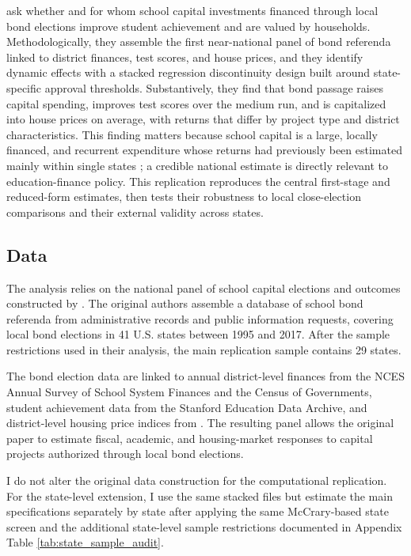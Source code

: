 \citet{biasi_what_2025} ask whether and for whom school capital investments financed through local bond elections improve student achievement and are valued by households. Methodologically, they assemble the first near-national panel of bond referenda linked to district finances, test scores, and house prices, and they identify dynamic effects with a stacked regression discontinuity design built around state-specific approval thresholds. Substantively, they find that bond passage raises capital spending, improves test scores over the medium run, and is capitalized into house prices on average, with returns that differ by project type and district characteristics. This finding matters because school capital is a large, locally financed, and recurrent expenditure whose returns had previously been estimated mainly within single states \citep{cellini2010value,hong2016investing,rauscher2020delayed}; a credible national estimate is directly relevant to education-finance policy. This replication reproduces the central first-stage and reduced-form estimates, then tests their robustness to local close-election comparisons and their external validity across states.

\subsection{Data}

The analysis relies on the national panel of school capital elections and outcomes constructed by \citet{biasi_what_2025}. The original authors assemble a database of school bond referenda from administrative records and public information requests, covering local bond elections in 41 U.S. states between 1995 and 2017. After the sample restrictions used in their analysis, the main replication sample contains 29 states.

The bond election data are linked to annual district-level finances from the NCES Annual Survey of School System Finances and the Census of Governments, student achievement data from the Stanford Education Data Archive, and district-level housing price indices from \citet{contat_larson_2024}. The resulting panel allows the original paper to estimate fiscal, academic, and housing-market responses to capital projects authorized through local bond elections.

I do not alter the original data construction for the computational replication. For the state-level extension, I use the same stacked files but estimate the main specifications separately by state after applying the same McCrary-based state screen and the additional state-level sample restrictions documented in Appendix Table \ref{tab:state_sample_audit}.

